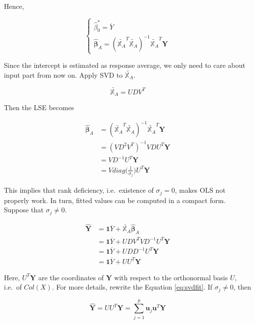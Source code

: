 \documentclass[]{book}
\theoremstyle{definition}
\theoremstyle{definition}
\theoremstyle{definition}
\theoremstyle{remark}
\begin{document}
Hence,

\[
\begin{cases}
  \hat\beta_0^{\ast} = \overline{Y} \\
  \boldsymbol{\hat\beta}_{A} = (\widetilde{\mathbb{X}_A}^T\widetilde{\mathbb{X}_A})^{-1}\widetilde{\mathbb{X}_A}^T\mathbf{Y}
\end{cases}
\]

Since the intercept is estimated as response average, we only need to care about input part from now on. Apply SVD to \(\widetilde{\mathbb{X}_A}\).

\[\widetilde{\mathbb{X}_A} = UDV^T\]

Then the LSE becomes

\begin{equation}
  \begin{split}
    \boldsymbol{\hat\beta}_{A} & = (\widetilde{\mathbb{X}_A}^T\widetilde{\mathbb{X}_A})^{-1}\widetilde{\mathbb{X}_A}^T\mathbf{Y} \\
    & = (VD^2 V^T)^{-1} VDU^T \mathbf{Y} \\
    & = VD^{-1} U^T \mathbf{Y} \\
    & = V diag\Big( \frac{1}{\sigma_j} \Big) U^T \mathbf{Y}
  \end{split}
  \label{eq:svdlse}
\end{equation}

This implies that rank deficiency, i.e.~existence of \(\sigma_j = 0\), makes OLS not properly work. In turn, fitted values can be computed in a compact form. Suppose that \(\sigma_j \neq 0\).

\begin{equation}
  \begin{split}
    \hat{\mathbf{Y}} & = \mathbf{1} \overline{Y} + \widetilde{\mathbb{X}_A} \boldsymbol{\hat\beta}_{A} \\
    & = \mathbf{1} \overline{Y} + UDV^T VD^{-1} U^T \mathbf{Y} \\
    & = \mathbf{1} \overline{Y} + UDD^{-1} U^T \mathbf{Y} \\
    & = \mathbf{1} \overline{Y} + U U^T \mathbf{Y}
  \end{split}
  \label{eq:svdfit}
\end{equation}

Here, \(U^T \mathbf{Y}\) are the coordinates of \(\mathbf{Y}\) with respect to the orthonormal basis \(U\), i.e.~of \(Col(X)\). For more details, rewrite the Equation \eqref{eq:svdfit}. If \(\sigma_j \neq 0\), then

\[\hat{\mathbf{Y}} = U U^T \mathbf{Y} = \sum_{j = 1}^p \mathbf{u}_j \mathbf{u}^T \mathbf{Y}\]
\end{document}
